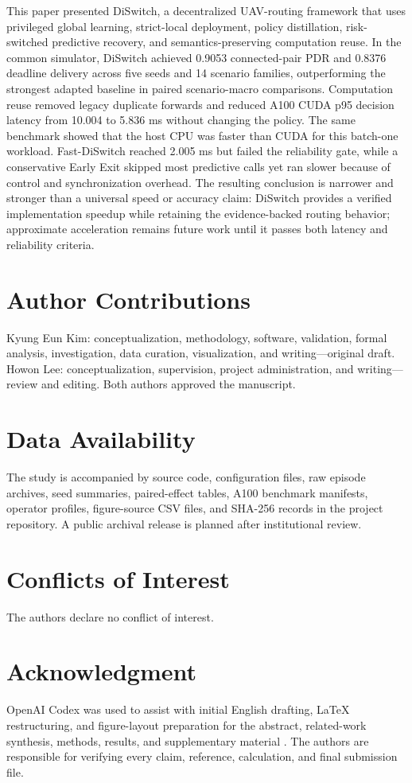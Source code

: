 \documentclass{ieeeaccess}
\newcommand{\DS}{DiSwitch}
\newcommand{\FastDS}{Fast-DiSwitch}
\begin{document}
This paper presented \DS{}, a decentralized UAV-routing framework that uses privileged global learning, strict-local deployment, policy distillation, risk-switched predictive recovery, and semantics-preserving computation reuse. In the common simulator, \DS{} achieved 0.9053 connected-pair PDR and 0.8376 deadline delivery across five seeds and 14 scenario families, outperforming the strongest adapted baseline in paired scenario-macro comparisons. Computation reuse removed legacy duplicate forwards and reduced A100 CUDA p95 decision latency from 10.004 to 5.836 ms without changing the policy. The same benchmark showed that the host CPU was faster than CUDA for this batch-one workload. \FastDS{} reached 2.005 ms but failed the reliability gate, while a conservative Early Exit skipped most predictive calls yet ran slower because of control and synchronization overhead. The resulting conclusion is narrower and stronger than a universal speed or accuracy claim: \DS{} provides a verified implementation speedup while retaining the evidence-backed routing behavior; approximate acceleration remains future work until it passes both latency and reliability criteria.

\section*{Author Contributions}
Kyung Eun Kim: conceptualization, methodology, software, validation, formal analysis, investigation, data curation, visualization, and writing---original draft. Howon Lee: conceptualization, supervision, project administration, and writing---review and editing. Both authors approved the manuscript.

\section*{Data Availability}
The study is accompanied by source code, configuration files, raw episode archives, seed summaries, paired-effect tables, A100 benchmark manifests, operator profiles, figure-source CSV files, and SHA-256 records in the project repository. A public archival release is planned after institutional review.

\section*{Conflicts of Interest}
The authors declare no conflict of interest.

\section*{Acknowledgment}
OpenAI Codex was used to assist with initial English drafting, LaTeX restructuring, and figure-layout preparation for the abstract, related-work synthesis, methods, results, and supplementary material \cite{openai2026codex}. The authors are responsible for verifying every claim, reference, calculation, and final submission file.
\end{document}
